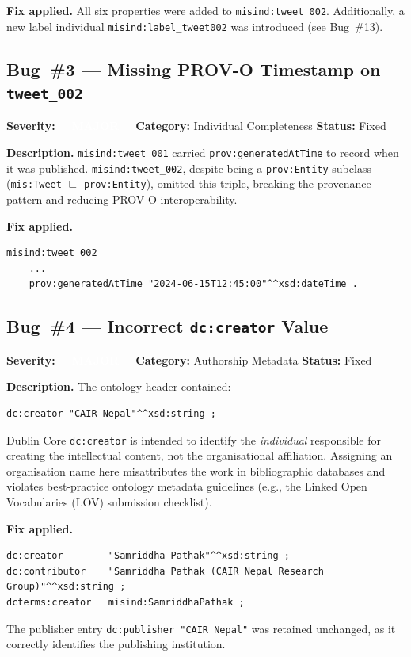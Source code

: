\documentclass[11pt, a4paper]{article}
\newcommand{\badgeMajor}{\textcolor{white}{\colorbox{severity-major}{\footnotesize\textbf{\ \ MAJOR\ \ }}}}
\newcommand{\ind}[1]{\texttt{misind:#1}}
\begin{document}
\textbf{Fix applied.} All six properties were added to \ind{tweet\_002}.
Additionally, a new label individual \ind{label\_tweet002} was introduced
(see Bug~\#13).

\subsection{Bug~\#3 --- Missing PROV-O Timestamp on \texttt{tweet\_002}}
\label{bug:3}

\textbf{Severity:} \badgeMajor\quad
\textbf{Category:} Individual Completeness\quad
\textbf{Status:} Fixed

\textbf{Description.}
\ind{tweet\_001} carried \texttt{prov:generatedAtTime} to record when it was
published. \ind{tweet\_002}, despite being a \texttt{prov:Entity} subclass
(\texttt{mis:Tweet} $\sqsubseteq$ \texttt{prov:Entity}), omitted this triple,
breaking the provenance pattern and reducing PROV-O interoperability.

\textbf{Fix applied.}
\begin{lstlisting}
misind:tweet_002
    ...
    prov:generatedAtTime "2024-06-15T12:45:00"^^xsd:dateTime .
\end{lstlisting}
\newpage
\subsection{Bug~\#4 --- Incorrect \texttt{dc:creator} Value}
\label{bug:4}

\textbf{Severity:} \badgeMajor\quad
\textbf{Category:} Authorship Metadata\quad
\textbf{Status:} Fixed

\textbf{Description.}
The ontology header contained:
\begin{lstlisting}
dc:creator "CAIR Nepal"^^xsd:string ;
\end{lstlisting}
Dublin Core \texttt{dc:creator} is intended to identify the \emph{individual}
responsible for creating the intellectual content, not the organisational
affiliation.
Assigning an organisation name here misattributes the work in bibliographic
databases and violates best-practice ontology metadata guidelines
(e.g., the Linked Open Vocabularies (LOV) submission checklist).

\textbf{Fix applied.}
\begin{lstlisting}
dc:creator        "Samriddha Pathak"^^xsd:string ;
dc:contributor    "Samriddha Pathak (CAIR Nepal Research Group)"^^xsd:string ;
dcterms:creator   misind:SamriddhaPathak ;
\end{lstlisting}
The publisher entry \texttt{dc:publisher "CAIR Nepal"} was retained unchanged,
as it correctly identifies the publishing institution.
\end{document}
